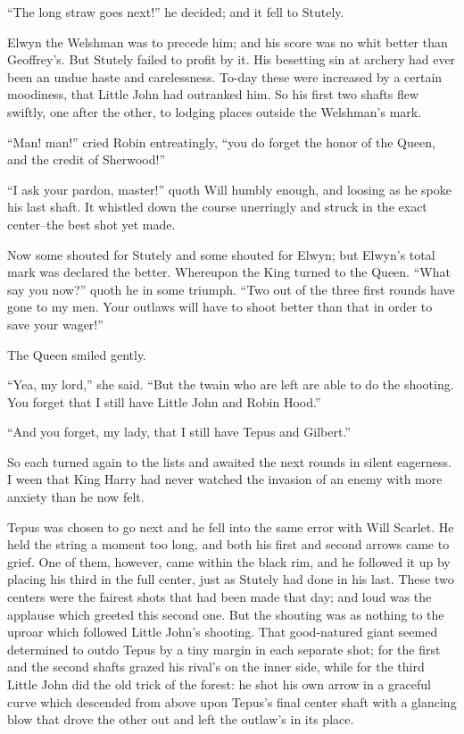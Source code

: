 ``The long straw goes next!'' he decided; and it fell to Stutely.

Elwyn the Welshman was to precede him; and his score was no whit better
than Geoffrey's. But Stutely failed to profit by it. His besetting sin
at archery had ever been an undue haste and carelessness. To-day these
were increased by a certain moodiness, that Little John had outranked
him. So his first two shafts flew swiftly, one after the other, to
lodging places outside the Welshman's mark.

``Man! man!'' cried Robin entreatingly, ``you do forget the honor of the
Queen, and the credit of Sherwood!''

``I ask your pardon, master!'' quoth Will humbly enough, and loosing as
he spoke his last shaft. It whistled down the course unerringly and
struck in the exact center--the best shot yet made.

Now some shouted for Stutely and some shouted for Elwyn; but Elwyn's
total mark was declared the better. Whereupon the King turned to the
Queen. ``What say you now?'' quoth he in some triumph. ``Two out of the
three first rounds have gone to my men. Your outlaws will have to shoot
better than that in order to save your wager!''

The Queen smiled gently.

``Yea, my lord,'' she said. ``But the twain who are left are able to do
the shooting. You forget that I still have Little John and Robin Hood.''

``And you forget, my lady, that I still have Tepus and Gilbert.''

So each turned again to the lists and awaited the next rounds in silent
eagerness. I ween that King Harry had never watched the invasion of an
enemy with more anxiety than he now felt.

Tepus was chosen to go next and he fell into the same error with Will
Scarlet. He held the string a moment too long, and both his first and
second arrows came to grief. One of them, however, came within the black
rim, and he followed it up by placing his third in the full center, just
as Stutely had done in his last. These two centers were the fairest
shots that had been made that day; and loud was the applause which
greeted this second one. But the shouting was as nothing to the uproar
which followed Little John's shooting. That good-natured giant seemed
determined to outdo Tepus by a tiny margin in each separate shot; for
the first and the second shafts grazed his rival's on the inner side,
while for the third Little John did the old trick of the forest: he shot
his own arrow in a graceful curve which descended from above upon
Tepus's final center shaft with a glancing blow that drove the other out
and left the outlaw's in its place.

